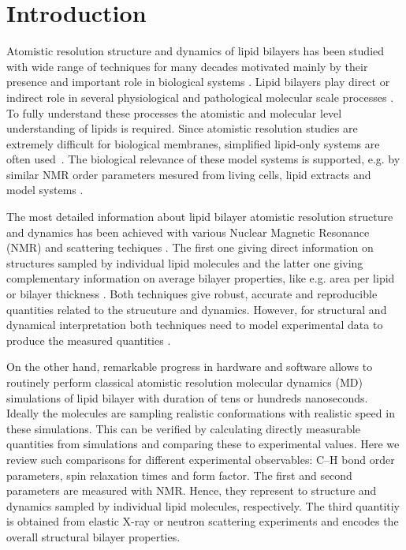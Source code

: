 \documentclass[aps,prl,superscriptaddress,twocolumn]{revtex4}
\begin{document}
\section{Introduction}
Atomistic resolution structure and dynamics of lipid bilayers has been studied
with wide range of techniques for many decades motivated mainly
by their presence and important role in biological systems \cite{israelachvili80,jacobs81,davis83,bloom91,nagle00,nagle13}.
Lipid bilayers play direct or indirect role in several physiological and pathological
molecular scale processes \cite{lee04,kinnunen09,Bohdanowicz13}. To fully understand these processes the atomistic and
molecular level understanding of lipids is required. Since atomistic resolution studies are
extremely difficult for biological membranes, simplified lipid-only systems are often used~\cite{seelig77c,israelachvili80,jacobs81,davis83,bloom91,nagle00,nagle13}.
The biological relevance of these model systems is supported, e.g. by similar NMR order parameters 
mesured from living cells, lipid extracts and model systems \cite{gally81,jacobs81,scherer87}. 

The most detailed information about lipid bilayer atomistic resolution structure and dynamics has been
achieved with various Nuclear Magnetic Resonance (NMR) and scattering techiques \cite{seelig77c,jacobs81,davis83,bloom91,nagle00,pabst10,kucerka11,marquardt15}. 
The first one giving direct information on structures sampled by individual lipid molecules \cite{seelig77c,jacobs81,davis83,bloom91} and
the latter one giving complementary information on average bilayer properties, like e.g. area per lipid or bilayer thickness \cite{nagle00,pabst10,kucerka11,marquardt15}.
Both techniques give robust, accurate and reproducible quantities related to the strucuture and dynamics.
However, for structural and dynamical interpretation both techniques need to model experimental data to produce 
the measured quantities \cite{jacobs81,davis83,bloom91,nagle00,pabst10,kucerka11,marquardt15}. 

On the other hand, remarkable progress in hardware and software allows to 
routinely perform classical atomistic resolution molecular dynamics (MD) simulations of lipid bilayer with 
duration of tens or hundreds nanoseconds. Ideally the molecules are sampling realistic
conformations with realistic speed in these simulations. This can be verified by calculating
directly measurable quantities from simulations and comparing these to experimental values.
Here we review such comparisons for different experimental observables: C--H bond order parameters,
spin relaxation times and form factor. The first and second parameters are measured with NMR. Hence, they 
represent to structure and dynamics sampled by individual lipid molecules, respectively.
The third quantitiy is obtained from elastic X-ray or neutron scattering experiments and encodes the overall structural bilayer properties.
\end{document}
